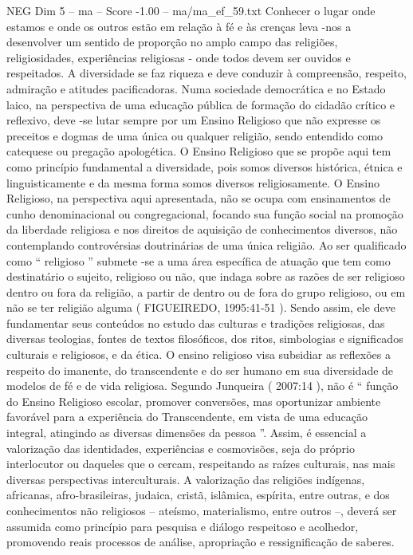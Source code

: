 \begin{textsample}{NEG Dim 5 – ma – Score -1.00 – ma/ma\_ef\_59.txt}
Conhecer o lugar onde estamos e onde os outros estão em relação à fé e às crenças leva -nos a desenvolver um sentido de proporção no amplo campo das religiões, religiosidades, experiências religiosas - onde todos devem ser ouvidos e respeitados.
A diversidade se faz riqueza e deve conduzir à compreensão, respeito, admiração e atitudes pacificadoras.
Numa sociedade democrática e no Estado laico, na perspectiva de uma educação pública de formação do cidadão crítico e reflexivo, deve -se lutar sempre por um Ensino Religioso que não expresse os preceitos e dogmas de uma única ou qualquer religião, sendo entendido como catequese ou pregação apologética.
O Ensino Religioso que se propõe aqui tem como princípio fundamental a diversidade, pois somos diversos histórica, étnica e linguisticamente e da mesma forma somos diversos religiosamente.
O Ensino Religioso, na perspectiva aqui apresentada, não se ocupa com ensinamentos de cunho denominacional ou congregacional, focando sua função social na promoção da liberdade religiosa e nos direitos de aquisição de conhecimentos diversos, não contemplando controvérsias doutrinárias de uma única religião.
Ao ser qualificado como “ religioso ” submete -se a uma área específica de atuação que tem como destinatário o sujeito, religioso ou não, que indaga sobre as razões de ser religioso dentro ou fora da religião, a partir de dentro ou de fora do grupo religioso, ou em não se ter religião alguma ( FIGUEIREDO, 1995:41-51 ).
Sendo assim, ele deve fundamentar seus conteúdos no estudo das culturas e tradições religiosas, das diversas teologias, fontes de textos filosóficos, dos ritos, simbologias e significados culturais e religiosos, e da ética.
O ensino religioso visa subsidiar as reflexões a respeito do imanente, do transcendente e do ser humano em sua diversidade de modelos de fé e de vida religiosa.
Segundo Junqueira ( 2007:14 ), não é “ função do Ensino Religioso escolar, promover conversões, mas oportunizar ambiente favorável para a experiência do Transcendente, em vista de uma educação integral, atingindo as diversas dimensões da pessoa ”.
Assim, é essencial a valorização das identidades, experiências e cosmovisões, seja do próprio interlocutor ou daqueles que o cercam, respeitando as raízes culturais, nas mais diversas perspectivas interculturais.
A valorização das religiões indígenas, africanas, afro-brasileiras, judaica, cristã, islâmica, espírita, entre outras, e dos conhecimentos não religiosos – ateísmo, materialismo, entre outros –, deverá ser assumida como princípio para pesquisa e diálogo respeitoso e acolhedor, promovendo reais processos de análise, apropriação e ressignificação de saberes.

\end{textsample}
